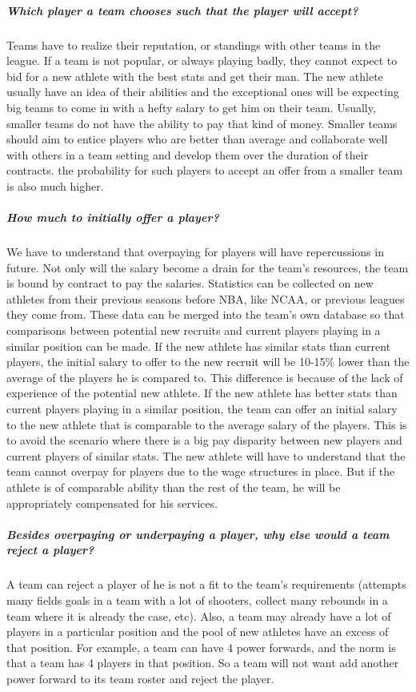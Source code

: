 \subparagraph{Which player a team chooses such that the player will accept?}Teams have to realize their reputation, or standings with other teams in the league. If a team is not popular, or always playing badly, they cannot expect to bid for a new athlete with the best stats and get their man. The new athlete usually have an idea of their abilities and the exceptional ones will be expecting big teams to come in with a hefty salary to get him on their team. Usually, smaller teams do not have the ability to pay that kind of money. Smaller teams should aim to entice players who are better than average and collaborate well with others in a team setting and develop them over the duration of their contracts. the probability for such players to accept an offer from a smaller team is also much higher.

\subparagraph{How much to initially offer a player?}We have to understand that overpaying for players will have repercussions in future. Not only will the salary become a drain for the team’s resources, the team is bound by contract to pay the salaries. Statistics can be collected on new athletes from their previous seasons before NBA, like NCAA, or previous leagues they come from. These data can be merged into the team’s own database so that comparisons between potential new recruits and current players playing in a similar position can be made. If the new athlete has similar stats than current players, the initial salary to offer to the new recruit will be 10-15\% lower than the average of the players he is compared to. This difference is because of the lack of experience of the potential new athlete. If the new athlete has better stats than current players playing in a similar position, the team can offer an initial salary to the new athlete that is comparable to the average salary of the players. This is to avoid the scenario where there is a big pay disparity between new players and current players of similar stats. The new athlete will have to understand that the team cannot overpay for players due to the wage structures in place. But if the athlete is of comparable ability than the rest of the team, he will be appropriately compensated for his services.

\subparagraph{Besides overpaying or underpaying a player, why else would a team reject a player?}A team can reject a player of he is not a fit to the team’s requirements (attempts many fields goals in a team with a lot of shooters, collect many rebounds in a team where it is already the case, etc). Also, a team may already have a lot of players in a particular position and the pool of new athletes have an excess of that position. For example, a team can have 4 power forwards, and the norm is that a team has 4 players in that position. So a team will not want add another power forward to its team roster and reject the player.
